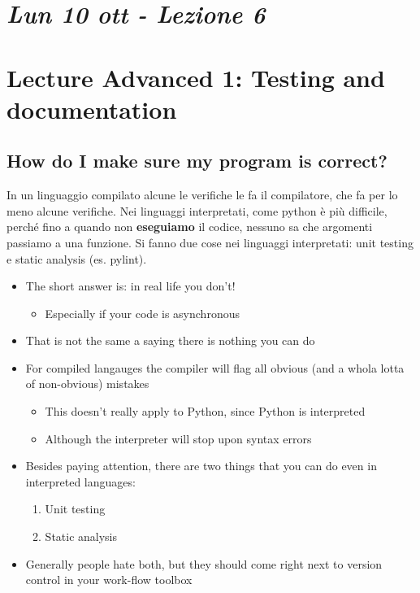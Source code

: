 \newpage

\section{\textit{Lun 10 ott - Lezione 6}}

\section{Lecture Advanced 1: Testing and documentation}

\subsection{How do I make sure my program is correct?}
In un linguaggio compilato alcune le verifiche le fa il compilatore, che fa per lo meno alcune verifiche. Nei linguaggi interpretati, come python è più difficile, perché fino a quando non \textbf{eseguiamo} il codice, nessuno sa che argomenti passiamo a una funzione.
Si fanno due cose nei linguaggi interpretati: unit testing e static analysis (es. pylint).

  \begin{itemize}
  \item The short answer is: in real life you don't!
    \begin{itemize}
    \item Especially if your code is asynchronous
    \end{itemize}
  \item \alert{That is not the same a saying there is nothing you can do}
  \item For compiled langauges the compiler will flag all obvious (and a whola
    lotta of non-obvious) mistakes
    \begin{itemize}
    \item This doesn't really apply to Python, since Python is interpreted
    \item Although the interpreter will stop upon syntax errors
    \end{itemize}
  \item Besides paying attention, there are two things that you can do even
    in interpreted languages:
    \begin{enumerate}
    \item \alert{Unit testing}
    \item \alert{Static analysis}
    \end{enumerate}
  \item Generally people hate both, but they should come right next to
    version control in your work-flow toolbox
  \end{itemize}

